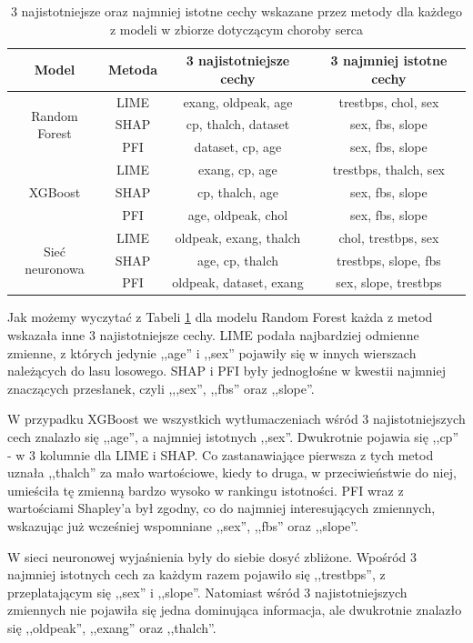 \begin{table}[H]
\centering
\caption{3 najistotniejsze oraz najmniej istotne cechy wskazane przez metody dla każdego z modeli w zbiorze dotyczącym choroby serca}
\label{tab:3_top_and_least_heart}
\begin{tabular}{|c|c|c|c|}
\hline
Model & Metoda & 3 najistotniejsze cechy & 3 najmniej istotne cechy \\ \hline
\multirow{3}{*}{Random Forest}& LIME& exang, oldpeak, age& trestbps, chol, sex\\ \cline{2-4} 
 & SHAP& cp, thalch, dataset& sex, fbs, slope\\ \cline{2-4} 
 & PFI& dataset, cp, age& sex, fbs, slope\\ \hline
\multirow{3}{*}{XGBoost}& LIME
& exang, cp, age& trestbps, thalch, sex\\ \cline{2-4} 
 & SHAP
& cp, thalch, age& sex, fbs, slope\\ \cline{2-4} 
 & PFI& age, oldpeak, chol& sex, fbs, slope\\ \hline
\multirow{3}{*}{Sieć neuronowa}& LIME
& oldpeak, exang, thalch& chol, trestbps, sex\\ \cline{2-4} 
 & SHAP
& age, cp, thalch& trestbps, slope, fbs\\ \cline{2-4} 
 & PFI& oldpeak, dataset, exang& sex, slope, trestbps \\ \hline
\end{tabular}
\end{table}

Jak możemy wyczytać z Tabeli \ref{tab:3_top_and_least_heart}  dla modelu Random Forest każda z metod wskazała inne 3 najistotniejsze cechy. LIME podała najbardziej odmienne zmienne, z których jedynie ,,age'' i ,,sex'' pojawiły się w innych wierszach należących do lasu losowego. SHAP i PFI były jednogłośne w kwestii najmniej znaczących przesłanek, czyli ,,,sex'', ,,fbs'' oraz ,,slope''. 

W przypadku XGBoost we wszystkich wytłumaczeniach wśród 3 najistotniejszych cech znalazło się ,,age'', a najmniej istotnych ,,sex''. Dwukrotnie pojawia się ,,cp'' - w 3 kolumnie dla LIME i SHAP. Co zastanawiające pierwsza z tych metod uznała ,,thalch'' za mało wartościowe, kiedy to druga, w przeciwieństwie do niej, umieściła tę zmienną bardzo wysoko w rankingu istotności. PFI wraz z wartościami Shapley'a był zgodny, co do najmniej interesujących zmiennych, wskazując już wcześniej wspomniane ,,sex'', ,,fbs'' oraz ,,slope''.

W sieci neuronowej wyjaśnienia były do siebie dosyć zbliżone. Wpośród 3 najmniej istotnych cech za każdym razem pojawiło się ,,trestbps'', z przeplatającym się ,,sex'' i ,,slope''. Natomiast wśród 3 najistotniejszych zmiennych nie pojawiła się jedna dominująca informacja, ale dwukrotnie znalazło się ,,oldpeak'', ,,exang'' oraz ,,thalch''.

